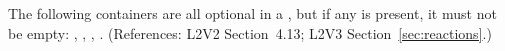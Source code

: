 The following containers are all optional in a \Reaction, but if any
is present, it must not be empty: ,
, , .
(References: L2V2 Section~4.13; L2V3 Section~\ref{sec:reactions}.)
